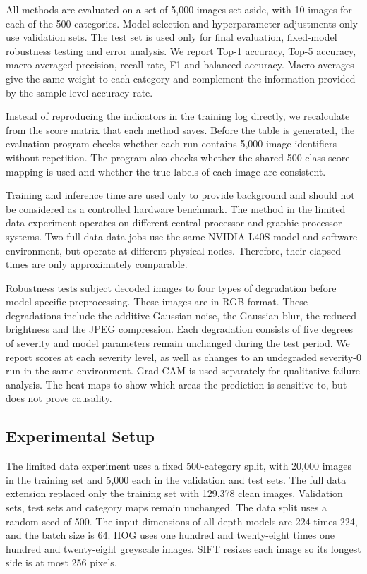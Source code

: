 All methods are evaluated on a set of 5,000 images set aside, with 10 images
for each of the 500 categories. Model selection and hyperparameter adjustments
only use validation sets. The test set is used only for final evaluation,
fixed-model robustness testing and error analysis. We report Top-1 accuracy,
Top-5 accuracy, macro-averaged precision, recall rate, F1 and balanced
accuracy. Macro averages give the same weight to each category and complement
the information provided by the sample-level accuracy rate.

Instead of reproducing the indicators in the training log directly, we
recalculate from the score matrix that each method saves. Before the table is
generated, the evaluation program checks whether each run contains 5,000 image
identifiers without repetition. The program also checks whether the shared
500-class score mapping is used and whether the true labels of each image are
consistent.

Training and inference time are used only to provide background and should not
be considered as a controlled hardware benchmark. The method in the limited
data experiment operates on different central processor and graphic processor
systems. Two full-data data jobs use the same NVIDIA L40S model and software
environment, but operate at different physical nodes. Therefore, their elapsed
times are only approximately comparable.

Robustness tests subject decoded images to four types of degradation before
model-specific preprocessing. These images are in RGB format. These
degradations include the additive Gaussian noise, the Gaussian blur, the
reduced brightness and the JPEG compression. Each degradation consists of five
degrees of severity and model parameters remain unchanged during the test
period. We report scores at each severity level, as well as changes to an
undegraded severity-0 run in the same environment. Grad-CAM is used separately
for qualitative failure analysis. The heat maps to show which areas the
prediction is sensitive to, but does not prove causality.

\subsection{Experimental Setup}
\label{sec:experimental_setup}

The limited data experiment uses a fixed 500-category split, with 20,000
images in the training set and 5,000 each in the validation and test sets. The
full data extension replaced only the training set with 129,378 clean images.
Validation sets, test sets and category maps remain unchanged. The data split
uses a random seed of 500. The input dimensions of all depth models are 224
times 224, and the batch size is 64. HOG uses one hundred and twenty-eight
times one hundred and twenty-eight greyscale images. SIFT resizes each image
so its longest side is at most 256 pixels.

